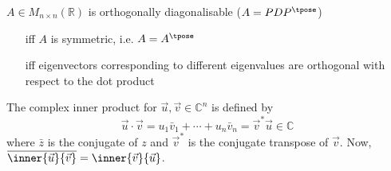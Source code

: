 \documentclass[10pt, a4paper]{article}
\newlength{\interwordspace}
\begin{document}
\begin{multicols}{2}
    \(A \in M_{n \times n}(\mathbb{R})\) is orthogonally diagonalisable (\(A = PDP^{\tpose}\))
    \begin{itemize}[leftmargin=1.0cm, labelsep=\interwordspace]
        \item[iff] \(A\) is symmetric, i.e. \(A = A^{\tpose}\)
        \item[iff] eigenvectors corresponding to different eigenvalues are orthogonal with respect to the dot product 
    \end{itemize}

    The complex inner product for \(\vec{u}, \vec{v} \in \mathbb{C}^n\) is defined by
    \[\vec{u} \cdot \vec{v} = u_1 \bar v_1 + \cdots + u_n \bar v_n = \vec{v}^{*} \vec{u} \in \mathbb{C}\]
    where \(\bar z\) is the conjugate of \(z\) and \(\vec{v}^{*}\) is the conjugate transpose of \(\vec{v}\). Now,
    \(\overline{\inner{\vec{u}}{\vec{v}}} = \inner{\vec{v}}{\vec{u}}\).

\end{multicols}
\end{document}
